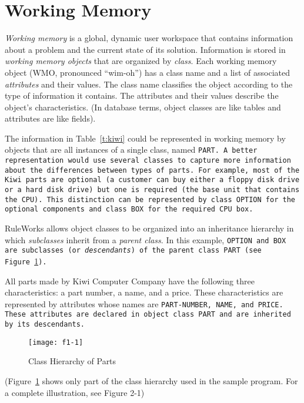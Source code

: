 \section{Working Memory}

\emph{Working memory} is a global, dynamic user workspace that
contains information about a problem and the current state of its
solution. Information is stored in \emph{working memory objects} that
are organized by \emph{class}.  Each working memory object (WMO,
pronounced ``wim-oh'') has a class name and a list of associated
\emph{attributes} and their values. The class name classifies the
object according to the type of information it contains. The
attributes and their values describe the object's characteristics. (In
database terms, object classes are like tables and attributes are like
fields).

The information in Table~\ref{t:kiwi} could be represented in working
memory by objects that are all instances of a single class, named
\tt{PART}. A better representation would use several classes to
capture more information about the differences between types of
parts. For example, most of the Kiwi parts are optional (a customer
can buy either a floppy disk drive or a hard disk drive) but one is
required (the base unit that contains the CPU). This distinction can
be represented by class \tt{OPTION} for the optional components and
class \tt{BOX} for the required CPU box.

RuleWorks allows object classes to be organized into an inheritance
hierarchy in which \emph{subclasses} inherit from a \emph{parent
  class}. In this example, \tt{OPTION} and \tt{BOX} are subclasses (or
\emph{descendants}) of the parent class \tt{PART} (see Figure~\ref{f:1-1}).

All parts made by Kiwi Computer Company have the following three
characteristics: a part number, a name, and a price. These
characteristics are represented by attributes whose names are
\tt{PART-NUMBER}, \tt{NAME}, and \tt{PRICE}. These attributes are
declared in object class \tt{PART} and are inherited by its
descendants.

\begin{figure}
  \centering
  \texttt{[image: f1-1]}
  \caption{Class Hierarchy of Parts}
  \label{f:1-1}
\end{figure}

(Figure~\ref{f:1-1} shows only part of the class hierarchy used in the
sample program. For a complete illustration, see Figure 2-1)

